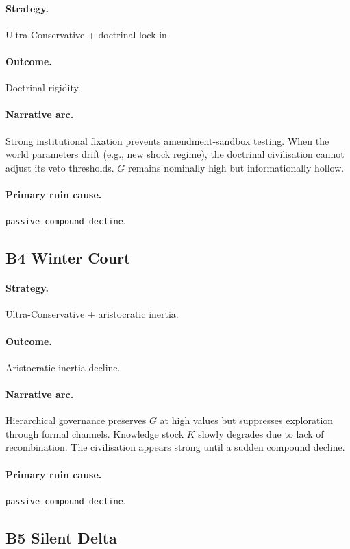 \paragraph{Strategy.} Ultra-Conservative + doctrinal lock-in.
\paragraph{Outcome.} Doctrinal rigidity.
\paragraph{Narrative arc.}
Strong institutional fixation prevents amendment-sandbox
testing. When the world parameters drift (e.g., new shock regime),
the doctrinal civilisation cannot adjust its veto thresholds. $G$
remains nominally high but informationally hollow.
\paragraph{Primary ruin cause.} \texttt{passive\_compound\_decline}.

\subsection{B4 Winter Court}
\label{civ:b4}

\paragraph{Strategy.} Ultra-Conservative + aristocratic
inertia.
\paragraph{Outcome.} Aristocratic inertia decline.
\paragraph{Narrative arc.}
Hierarchical governance preserves $G$ at high values but
suppresses exploration through formal channels. Knowledge stock
$K$ slowly degrades due to lack of recombination. The civilisation
appears strong until a sudden compound decline.
\paragraph{Primary ruin cause.} \texttt{passive\_compound\_decline}.

\subsection{B5 Silent Delta}
\label{civ:b5}

